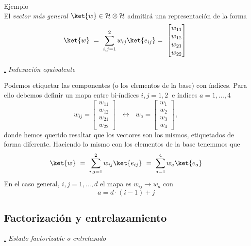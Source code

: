 \documentclass[a4paper,11pt]{book} %
\numberwithin{equation}{chapter}
\def\subsubiContadorIt{\par\addtocounter{subsubsection}{1}\underline{\it\thesubsubsection.}\hskip0.5cm \setcounter{subsubsubsectionIt}{0}}
\newcommand{\SubsubiIt}[1]{
		\subsubiContadorIt \textit{#1}
	}
\newcounter{subsubsubsectionIt}[subsubsection]
\begin{document}
\begin{mybox_green}{Ejemplo}
\begin{equation}
\end{equation}
El \textit{vector más general}  $\ket{w}\in \mathcal{H}\otimes\mathcal{H}$ admitirá una representación de la forma
\begin{equation}
\ket{w} ~= ~ \sum_{i,j=1}^2 w_{ij} \ket{e_{ij}}=~ \begin{bmatrix}w_{11}\\ w_{12}\\ w_{21} \\ w_{22}  \end{bmatrix}  ~  
\end{equation}
	\end{mybox_green}


			\SubsubiIt{Indexación equivalente}

Podemos etiquetar las componentes (o los elementos de la base) con índices. Para ello debemos definir un mapa  entre bi-índices $i,j=1,2~$ e índices $a=1,...,4$
	\begin{equation}
	w_{ij} =\begin{bmatrix} w_{11} \\ w_{12} \\ w_{21} \\ w_{22} \end{bmatrix} ~~~\longleftrightarrow ~~~
w_a  = \begin{bmatrix} w_1 \\ w_2 \\ w_3 \\ w_4 \end{bmatrix} \, ,
	\end{equation}
donde hemos querido resaltar que los vectores son los mismos, etiquetados de forma diferente. Haciendo lo mismo con los elementos de la base tenemmos que
	\begin{equation}
	\ket{w} ~= ~ \sum_{i,j=1}^2 w_{ij} \ket{e_{ij}} ~=~ \sum_{a=1}^{4} w_{a} \ket{e_{a}}
	\end{equation}
En el caso general, $i,j=1,...,d$ el mapa es $w_{ij}  \to  w_a$ con
	\begin{equation}
	a = d \cdot (i-1) + j 
	\end{equation}


		\subsection{Factorización y entrelazamiento}



			\SubsubiIt{Estado factorizable o entrelazado}
\end{document}
